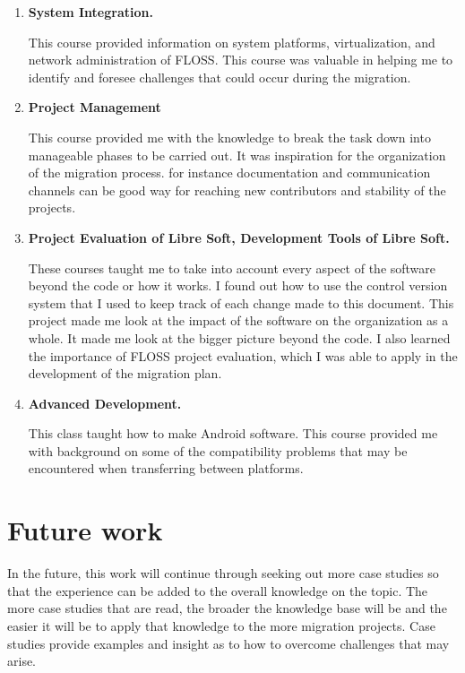 \begin{enumerate}[itemsep=0ex]
 \item \textbf{System Integration. }
 
 This course provided information on system platforms, virtualization, and network administration of FLOSS. This course was valuable in helping me to identify and foresee challenges that could occur during the migration.
 
\item \textbf{Project Management }

This course provided me with the knowledge to break the task down into manageable phases to be carried out. It was inspiration for the organization of the migration process. for instance documentation and communication channels can be good way for reaching new contributors and stability of the projects. 

\item \textbf{Project Evaluation of Libre Soft, Development Tools of Libre Soft.}

These courses taught me to take into account every aspect of the software beyond the code or how it works. I found out how to use the control version system that I used to keep track of each change made to this document. This project made me look at the impact of the software on the organization as a whole. It made me look at the bigger picture beyond the code.  I also learned the importance of FLOSS project evaluation, which I was able to apply in the development of the migration plan. 

\item\textbf{ Advanced Development. }

This class taught how to make Android software. This course  provided me with background on some of the compatibility problems that may be encountered when transferring between platforms.          

                                                                                               
	\end{enumerate}
\section{Future work}
\label{sec:future}
In the future, this work will continue through seeking out more case studies so that the experience can be added to the overall knowledge on the topic. The more case studies that are read, the broader the knowledge base will be and the easier it will be to apply that knowledge to the more migration projects. Case studies provide examples and insight as to how to overcome challenges that may arise. 

